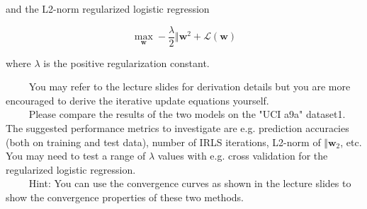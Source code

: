 \documentclass[a4paper]{article}
\begin{document}
and the L2-norm regularized logistic regression


\begin{equation}
    \max_{\pmb{w} } - \frac{\lambda}{2}\Vert{\pmb{w}}^2 + \mathcal{L(\pmb{w})}
\end{equation}

where $\lambda$ is the positive regularization constant.

$\qquad$ You may refer to the lecture slides for derivation details but you are more
encouraged to derive the iterative update equations yourself.\\

$\qquad$ Please compare the results of the two models on the "UCI a9a" dataset1. The suggested performance metrics to investigate are e.g. prediction accuracies (both on training and test data), number of IRLS iterations, L2-norm of $\Vert{\pmb{w}}_2$, etc. You may need to test a range of $\lambda$  values with e.g. cross validation for the regularized logistic regression.\\

$\qquad$ Hint: You can use the convergence curves as shown in the lecture slides to
show the convergence properties of these two methods.










%
\end{document}
